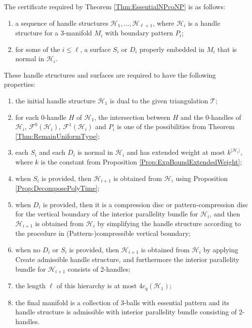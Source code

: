 \documentclass[oneside]{amsart}
\numberwithin{equation}{section}
\theoremstyle{plain}
\theoremstyle{definition}
\newcommand{\calT}{{\mathcal{T}}}
\newcommand{\calH}{\mathcal{H}}
\begin{document}
The certificate required by Theorem \ref{Thm:EssentialNPcoNP} is as follows:
\begin{enumerate}
\item a sequence of handle structures $\mathcal{H}_1, \dots, \mathcal{H}_{\ell+1}$, where $\mathcal{H}_i$ is a handle structure for a 3-manifold $M_i$ with boundary pattern $P_i$;
\item for some of the $i \leq \ell$, a surface $S_i$ or $D_i$ properly embedded in $M_i$ that is normal in $\mathcal{H}_i$.
\end{enumerate}
These handle structures and surfaces are required to have the following properties:
\begin{enumerate}
\item the initial handle structure $\calH_1$ is dual to the given triangulation $\calT$;
\item for each 0-handle $H$ of $\mathcal{H}_1$, the intersection between $H$ and the 0-handles of $\mathcal{H}_i$, $\mathcal{F}^0(\mathcal{H}_i)$, $\mathcal{F}^1(\mathcal{H}_i)$ and $P_i$ is one of the possibilities from Theorem \ref{Thm:RemainUniformType};
\item each $S_i$ and each $D_i$ is normal in $\mathcal{H}_i$ and has extended weight at most $k^{|\mathcal{H}_i|}$, where $k$ is the constant from Proposition \ref{Prop:ExpBoundExtendedWeight};
\item when $S_i$ is provided, then $\mathcal{H}_{i+1}$ is obtained from $\mathcal{H}_i$ using Proposition \ref{Prop:DecomposePolyTime};
\item when $D_i$ is provided, then it is a compression disc or pattern-compression disc for the vertical boundary of the interior parallelity bundle for $\mathcal{H}_i$, and then $\mathcal{H}_{i+1}$ is obtained from $\mathcal{H}_i$ by simplifying the handle structure according to the procedure in {\sc (Pattern-)compressible vertical boundary};
\item when no $D_i$ or $S_i$ is provided, then $\mathcal{H}_{i+1}$ is obtained from $\mathcal{H}_i$ by applying {\sc Create admissible handle structure}, and furthermore the interior parallelity bundle for $\mathcal{H}_{i+1}$ consists of 2-handles;
\item the length $\ell$ of this hierarchy is at most $4c_q(\mathcal{H}_1)$;
\item the final manifold is a collection of 3-balls with essential pattern and its handle structure is admissible with interior parallelity bundle consisting of 2-handles.
\end{enumerate}
\end{document}
